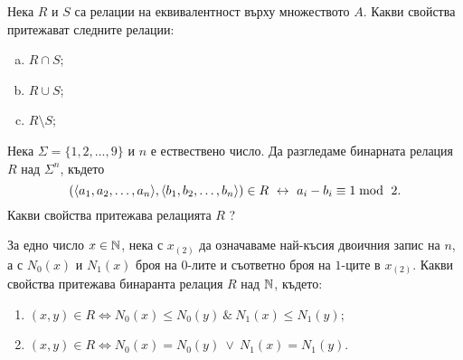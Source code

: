 \begin{problem}
  Нека $R$ и $S$ са релации на еквивалентност върху множеството $A$.
  Какви свойства притежават следните релации:
  \begin{enumerate}[a)]
  \item
    $R \cap S$;
  \item
    $R \cup S$;
  \item
    $R \setminus S$;
  \end{enumerate}
\end{problem}

\begin{problem}
  Нека $\Sigma = \{1,2,\dots,9\}$ и $n$ е ествествено число.
  Да разгледаме бинарната релация $R$ над $\Sigma^n$, където
  \[(\langle{a_1,a_2,\dots,a_n}\rangle,\langle{b_1,b_2,\dots,b_n}\rangle) \in R \ \leftrightarrow\  a_i - b_i \equiv 1 \bmod\ 2.\]
  Какви свойства притежава релацията $R$ ?
\end{problem}

\begin{problem}
  За едно число $x \in \mathbb{N}$, нека с $x_{(2)}$ да означаваме най-късия двоичния запис на $n$,
  а с $N_0(x)$ и $N_1(x)$ броя на $0$-лите и съответно броя на $1$-ците в $x_{(2)}$.
  Какви свойства притежава бинаранта релация $R$ над $\mathbb{N}$, където:
  \begin{enumerate}
  \item 
    $(x,y) \in R \iff N_0(x) \leq N_0(y)\ \&\ N_1(x) \leq N_1(y)$;
  \item
    $(x,y) \in R \iff N_0(x) = N_0(y)\ \vee\ N_1(x) = N_1(y)$.
  \end{enumerate}
\end{problem}

